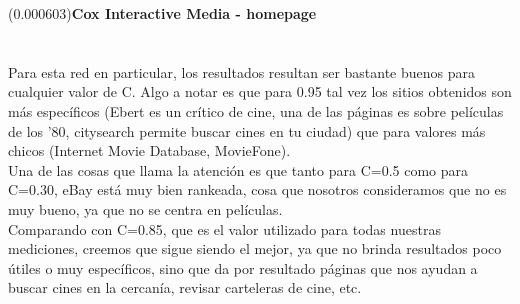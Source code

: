 \documentclass[a4paper]{article}
\begin{document}
(0.000603)\textbf{Cox Interactive Media - homepage} \\
\\
\\
Para esta red en particular, los resultados resultan ser bastante buenos para cualquier valor de C. Algo a notar es que para 0.95 tal vez los sitios obtenidos son más específicos (Ebert es un crítico de cine, una de las páginas es sobre películas de los '80, citysearch permite buscar cines en tu ciudad) que para valores más chicos (Internet Movie Database, MovieFone). \\
Una de las cosas que llama la atención es que tanto para C=0.5 como para C=0.30, eBay está muy bien rankeada, cosa que nosotros consideramos que no es muy bueno, ya que no se centra en películas.\\
Comparando con C=0.85, que es el valor utilizado para todas nuestras mediciones, creemos que sigue siendo el mejor, ya que no brinda resultados poco útiles o muy específicos, sino que da por resultado páginas que nos ayudan a buscar cines en la cercanía, revisar carteleras de cine, etc.
\\
\\
\\
\end{document}

